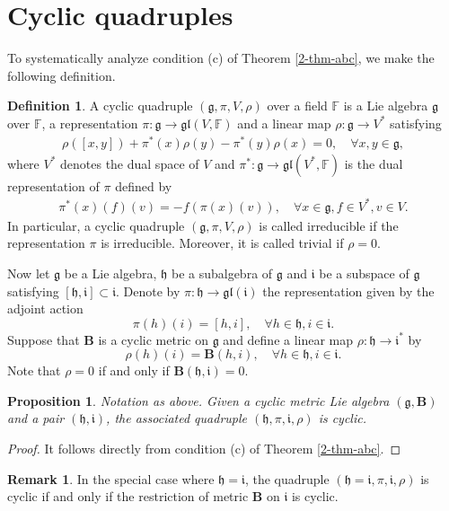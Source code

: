 \documentclass[reqno]{amsart}
\newtheorem{prop}[thm]{Proposition}
\theoremstyle{definition}
\newtheorem{defn}[thm]{Definition}
\newtheorem{rem}[thm]{Remark}
\begin{document}
\section{Cyclic quadruples}\label{sec4}
To systematically analyze condition (c) of Theorem \ref{2-thm-abc}, we make the following definition.
\begin{defn}\label{5.1-def-cyclic-quad}
A cyclic quadruple $(\mathfrak{g},\pi,V,\rho)$ over a field $\mathbb{F}$ is a Lie algebra $\mathfrak{g}$ over
$\mathbb{F}$,  a representation $\pi:\mathfrak{g}\rightarrow \mathfrak{gl}(V,\mathbb{F})$ and a linear map $\rho:\mathfrak{g}\rightarrow V^{*}$ satisfying
\begin{eqnarray*}
\rho([x,y])+\pi^{\ast}(x)\rho(y)-\pi^{\ast}(y)\rho(x)=0,\quad \forall x,y\in\mathfrak{g},
\end{eqnarray*}
where $V^{*}$ denotes the dual space of $V$ and $\pi^{*}:\mathfrak{g}\rightarrow \mathfrak{gl}(V^{\ast},\mathbb{F})$ is the dual representation of $\pi$ defined  by
\begin{eqnarray*}
\pi^{*}(x)(f)(v)=-f(\pi(x)(v)), \quad \forall x\in \mathfrak{g}, f\in V^{*}, v\in V.
\end{eqnarray*}
In particular, a cyclic quadruple $(\mathfrak{g},\pi,V,\rho)$ is called irreducible if the representation $\pi$ is irreducible.
Moreover, it is called trivial if $\rho=0$.
\end{defn}

Now let $\mathfrak{g}$ be a  Lie algebra,  $\mathfrak{h}$ be a subalgebra of $\mathfrak{g}$ and $\mathfrak{i}$ be a subspace of $\mathfrak{g}$ satisfying $[\mathfrak{h},\mathfrak{i}]\subset \mathfrak{i}$.
Denote by $\pi: \mathfrak{h}\rightarrow \mathfrak{gl}(\mathfrak{i})$ the representation  given by the adjoint action
$$\pi(h)(i)=[h,i], \quad \forall h\in \mathfrak{h}, i\in \mathfrak{i}.$$
Suppose  that $\mathbf{B}$ is a cyclic metric on $\mathfrak{g}$ and define a linear map
$\rho: \mathfrak{h}\rightarrow \mathfrak{i}^{*}$  by
$$\rho(h)(i)=\mathbf{B}(h,i), \quad \forall h\in \mathfrak{h}, i\in \mathfrak{i}.$$
Note that $\rho=0$ if and only if $\mathbf{B}(\mathfrak{h},\mathfrak{i})=0$.
\begin{prop}\label{5-prop-decom-h-i}
Notation as above. Given a cyclic metric Lie algebra $(\mathfrak{g}, \mathbf{B})$ and a pair $(\mathfrak{h},\mathfrak{i})$,  the associated  quadruple $(\mathfrak{h},\pi,\mathfrak{i},\rho)$ is cyclic.
\end{prop}
\begin{proof}
It follows directly from condition (c) of Theorem \ref{2-thm-abc}.
\end{proof}
\begin{rem}
In the special case where  $\mathfrak{h}=\mathfrak{i}$, the quadruple $(\mathfrak{h}=\mathfrak{i},\pi,\mathfrak{i},\rho)$ is cyclic if and only if the restriction of metric $\mathbf{B}$ on $\mathfrak{i}$ is cyclic.
\end{rem}
\end{document}
